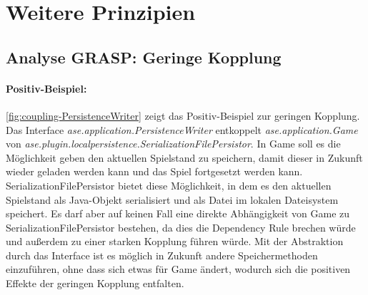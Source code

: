 \chapter{Weitere Prinzipien} 

\section{Analyse GRASP: Geringe Kopplung} \label{sec:low-coupling}

\subsubsection{Positiv-Beispiel:}

\autoref{fig:coupling-PersistenceWriter} zeigt das Positiv-Beispiel zur geringen Kopplung. \\
Das Interface \textit{ase.application.PersistenceWriter} entkoppelt \textit{ase.application.Game} von 
\textit{ase.plugin.localpersistence.SerializationFilePersistor}. In Game soll es die Möglichkeit geben den aktuellen 
Spielstand zu speichern, damit dieser in Zukunft wieder geladen werden kann und das Spiel fortgesetzt werden kann. 
SerializationFilePersistor bietet diese Möglichkeit, in dem es den aktuellen Spielstand als Java-Objekt serialisiert 
und als Datei im lokalen Dateisystem speichert. Es darf aber auf keinen Fall eine direkte Abhängigkeit von 
Game zu SerializationFilePersistor bestehen, da dies die Dependency Rule brechen würde und außerdem zu einer starken 
Kopplung führen würde. Mit der Abstraktion durch das Interface ist es möglich in Zukunft andere Speichermethoden einzuführen,
ohne dass sich etwas für Game ändert, wodurch sich die positiven Effekte der geringen Kopplung entfalten. 

